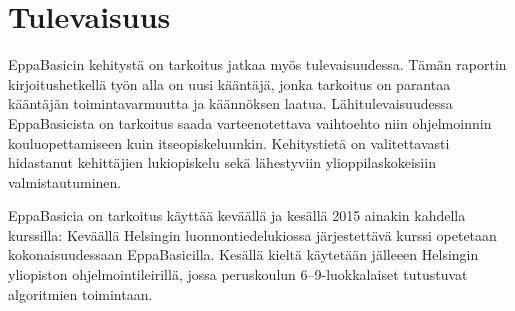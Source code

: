 \section{Tulevaisuus}
EppaBasicin kehitystä on tarkoitus
jatkaa myös tulevaisuudessa.
Tämän raportin kirjoitushetkellä työn alla
on uusi kääntäjä,
jonka tarkoitus on parantaa kääntäjän
toimintavarmuutta ja käännöksen laatua.
Lähitulevaisuudessa EppaBasicista on tarkoitus
saada varteenotettava vaihtoehto niin ohjelmoinnin
kouluopettamiseen kuin itseopiskeluunkin.
Kehitystietä on valitettavasti hidastanut kehittäjien
lukiopiskelu sekä lähestyviin ylioppilaskokeisiin
valmistautuminen.

EppaBasicia on tarkoitus käyttää keväällä
ja kesällä 2015 ainakin kahdella kurssilla:
Keväällä Helsingin luonnontiedelukiossa
järjestettävä kurssi opetetaan kokonaisuudessaan
EppaBasicilla.
Kesällä kieltä käytetään jälleeen
Helsingin yliopiston
ohjelmointileirillä, jossa peruskoulun
6--9-luokkalaiset tutustuvat
algoritmien toimintaan.